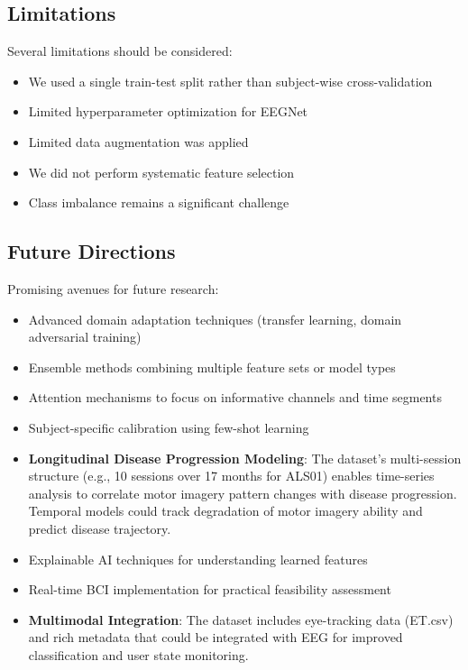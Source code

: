 \documentclass[conference]{IEEEtran}
\begin{document}
\subsection{Limitations}

Several limitations should be considered:
\begin{itemize}
    \item We used a single train-test split rather than subject-wise cross-validation
    \item Limited hyperparameter optimization for EEGNet
    \item Limited data augmentation was applied
    \item We did not perform systematic feature selection
    \item Class imbalance remains a significant challenge
\end{itemize}

\subsection{Future Directions}

Promising avenues for future research:
\begin{itemize}
    \item Advanced domain adaptation techniques (transfer learning, domain adversarial training)
    \item Ensemble methods combining multiple feature sets or model types
    \item Attention mechanisms to focus on informative channels and time segments
    \item Subject-specific calibration using few-shot learning
    \item \textbf{Longitudinal Disease Progression Modeling}: The dataset's multi-session structure (e.g., 10 sessions over 17 months for ALS01) enables time-series analysis to correlate motor imagery pattern changes with disease progression. Temporal models could track degradation of motor imagery ability and predict disease trajectory.
    \item Explainable AI techniques for understanding learned features
    \item Real-time BCI implementation for practical feasibility assessment
    \item \textbf{Multimodal Integration}: The dataset includes eye-tracking data (ET.csv) and rich metadata that could be integrated with EEG for improved classification and user state monitoring.
\end{itemize}
\end{document}
